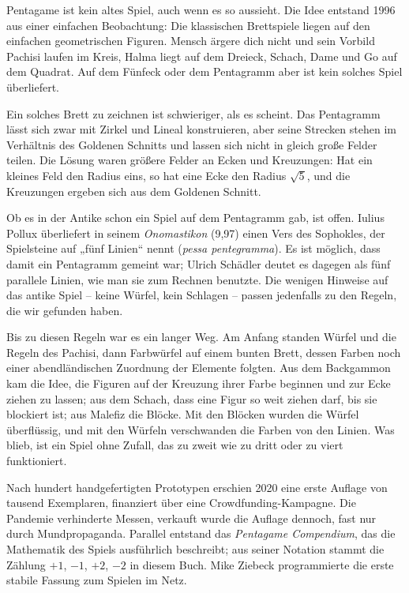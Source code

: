 \documentclass[12pt,paper=a5,DIV=13,headings=small,twoside=true,open=any]{scrbook}
\newlength{\normalparindent}
\newenvironment{einleitung}
  {\par\justifying\setlength{\parindent}{\normalparindent}\setlength{\parskip}{0pt}}
  {\par}
\begin{document}
\begin{einleitung}
Pentagame ist kein altes Spiel, auch wenn es so aussieht. Die Idee entstand 1996 aus einer einfachen Beobachtung: Die klassischen Brettspiele liegen auf den einfachen geometrischen Figuren. Mensch ärgere dich nicht und sein Vorbild Pachisi laufen im Kreis, Halma liegt auf dem Dreieck, Schach, Dame und Go auf dem Quadrat. Auf dem Fünfeck oder dem Pentagramm aber ist kein solches Spiel überliefert.

Ein solches Brett zu zeichnen ist schwieriger, als es scheint. Das Pentagramm lässt sich zwar mit Zirkel und Lineal konstruieren, aber seine Strecken stehen im Verhältnis des Goldenen Schnitts und lassen sich nicht in gleich große Felder teilen. Die Lösung waren größere Felder an Ecken und Kreuzungen: Hat ein kleines Feld den Radius eins, so hat eine Ecke den Radius $\sqrt{5}$, und die Kreuzungen ergeben sich aus dem Goldenen Schnitt.

Ob es in der Antike schon ein Spiel auf dem Pentagramm gab, ist offen. Iulius Pollux überliefert in seinem \textit{Onomastikon} (9,97) einen Vers des Sophokles, der Spielsteine auf „fünf Linien“ nennt (\textit{pessa pentegramma}). Es ist möglich, dass damit ein Pentagramm gemeint war; Ulrich Schädler deutet es dagegen als fünf parallele Linien, wie man sie zum Rechnen benutzte. Die wenigen Hinweise auf das antike Spiel – keine Würfel, kein Schlagen – passen jedenfalls zu den Regeln, die wir gefunden haben.

Bis zu diesen Regeln war es ein langer Weg. Am Anfang standen Würfel und die Regeln des Pachisi, dann Farbwürfel auf einem bunten Brett, dessen Farben noch einer abendländischen Zuordnung der Elemente folgten. Aus dem Backgammon kam die Idee, die Figuren auf der Kreuzung ihrer Farbe beginnen und zur Ecke ziehen zu lassen; aus dem Schach, dass eine Figur so weit ziehen darf, bis sie blockiert ist; aus Malefiz die Blöcke. Mit den Blöcken wurden die Würfel überflüssig, und mit den Würfeln verschwanden die Farben von den Linien. Was blieb, ist ein Spiel ohne Zufall, das zu zweit wie zu dritt oder zu viert funktioniert.

Nach hundert handgefertigten Prototypen erschien 2020 eine erste Auflage von tausend Exemplaren, finanziert über eine Crowdfunding-Kampagne. Die Pandemie verhinderte Messen, verkauft wurde die Auflage dennoch, fast nur durch Mundpropaganda. Parallel entstand das \textit{Pentagame Compendium}, das die Mathematik des Spiels ausführlich beschreibt; aus seiner Notation stammt die Zählung $+1$, $-1$, $+2$, $-2$ in diesem Buch. Mike Ziebeck programmierte die erste stabile Fassung zum Spielen im Netz.


\end{einleitung}
\end{document}
